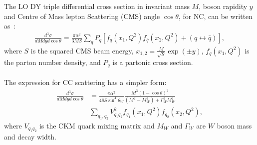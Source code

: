 The LO DY triple differential cross section in
invariant mass \(M\), boson rapidity \(y\) and Centre of Mass 
lepton Scattering (CMS) angle \(\cos\theta\), for NC, 
can be written as~\cite{Drell:1970wh,Yamada:1981mw}:
\begin{align}
 \textstyle
 \frac{d^3\sigma}{dM{d}y d\cos\theta} =  
 \frac{\pi\alpha^2}{3MS}\sum_{q}P_q \left[f_q(x_1,Q^2)f_{\bar{q}}(x_2,Q^2) 
 + (q\leftrightarrow\bar{q})\right],
\end{align}
where \(S\) is the squared CMS beam energy, \(x_{1,2} = \frac{M}{\sqrt{S}}\exp(\pm y)\), $f_q(x_1,Q^2)$ 
is the parton number density, and 
$P_q$ is a partonic cross section. 
%
\\
\\
The expression for CC  scattering has a simpler form:
\begin{align}
\frac{d^3\sigma}{dMdyd\cos\theta} &=
 \frac{\pi\alpha^2}{48S\sin^4\theta_W}
 \frac{M^3(1-\cos\theta)^2}{(M^2-M_W^2)+\Gamma_W^2M_W^2}  \nonumber \\
 & \sum_{q_1,q_2}V_{q_1q_2}^2f_{q_1}(x_1,Q^2)f_{q_2}(x_2,Q^2),
\end{align}
where \(V_{q_1q_2}\) is the CKM quark mixing matrix and \(M_W\) and \(\Gamma_W\)
are \(W\) boson mass and decay width.


